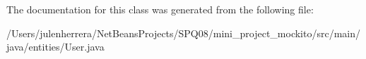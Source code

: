 The documentation for this class was generated from the following file\+:\begin{DoxyCompactItemize}
\item 
/\+Users/julenherrera/\+Net\+Beans\+Projects/\+S\+P\+Q08/mini\+\_\+project\+\_\+mockito/src/main/java/entities/User.\+java\end{DoxyCompactItemize}

